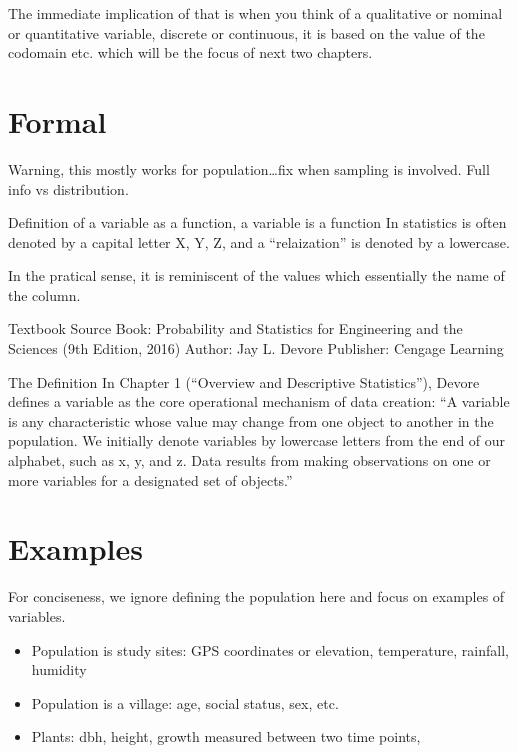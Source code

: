 \documentclass[
  letterpaper,
  DIV=11,
  numbers=noendperiod]{scrreprt}
\begin{document}
The immediate implication of that is when you think of a qualitative or
nominal or quantitative variable, discrete or continuous, it is based on
the value of the codomain etc. which will be the focus of next two
chapters.

\section*{Formal}\label{formal-15}


Warning, this mostly works for population\ldots fix when sampling is
involved. Full info vs distribution.

Definition of a variable as a function, a variable is a function In
statistics is often denoted by a capital letter X, Y, Z, and a
``relaization'' is denoted by a lowercase.

In the pratical sense, it is reminiscent of the values which essentially
the name of the column.

Textbook Source Book: Probability and Statistics for Engineering and the
Sciences (9th Edition, 2016) Author: Jay L. Devore Publisher: Cengage
Learning

The Definition In Chapter 1 (``Overview and Descriptive Statistics''),
Devore defines a variable as the core operational mechanism of data
creation: ``A variable is any characteristic whose value may change from
one object to another in the population. We initially denote variables
by lowercase letters from the end of our alphabet, such as x, y, and z.
Data results from making observations on one or more variables for a
designated set of objects.''

\section*{Examples}\label{examples-14}


For conciseness, we ignore defining the population here and focus on
examples of variables.

\begin{itemize}
\item
  Population is study sites: GPS coordinates or elevation, temperature,
  rainfall, humidity
\item
  Population is a village: age, social status, sex, etc.
\item
  Plants: dbh, height, growth measured between two time points,
\end{itemize}
\end{document}
